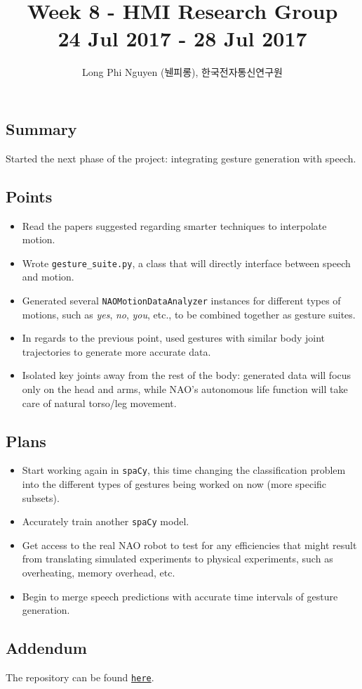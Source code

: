 \documentclass{article}
\title{Week 8 - HMI Research Group \\ \large 24 Jul 2017 - 28 Jul 2017}
\author{Long Phi Nguyen (뉀피롱), 한국전자통신연구원}
\begin{document}
  \maketitle


  \subsection*{Summary} Started the next phase of the project: integrating gesture generation with speech.

  \subsection*{Points}
  \begin{itemize}
    \item Read the papers suggested regarding smarter techniques to interpolate motion.
    \item Wrote \verb|gesture_suite.py|, a class that will directly interface between speech and motion.
    \item Generated several \verb|NAOMotionDataAnalyzer| instances for different types of motions, such as \emph{yes}, \emph{no}, \emph{you}, etc., to be combined together as gesture suites.
    \item In regards to the previous point, used gestures with similar body joint trajectories to generate more accurate data.
    \item Isolated key joints away from the rest of the body: generated data will focus only on the head and arms, while NAO's autonomous life function will take care of natural torso/leg movement.
  \end{itemize}

  \subsection*{Plans}
  \begin{itemize}
    \item Start working again in \verb|spaCy|, this time changing the classification problem into the different types of gestures being worked on now (more specific subsets).
    \item Accurately train another \verb|spaCy| model.
    \item Get access to the real NAO robot to test for any efficiencies that might result from translating simulated experiments to physical experiments, such as overheating, memory overhead, etc.
    \item Begin to merge speech predictions with accurate time intervals of gesture generation.
  \end{itemize}

  \subsection*{Addendum}
  The repository can be found \href{https://github.com/longnguyen1997/nao_animations}{\texttt{here}}.
\end{document}
